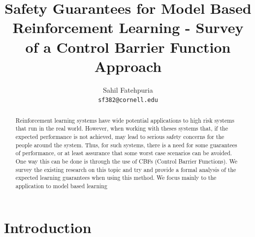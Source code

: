 \documentclass{article}
\title{Safety Guarantees for Model Based Reinforcement Learning - Survey of a Control Barrier Function Approach}
\author{%
  Sahil Fatehpuria \\
  \texttt{sf382@cornell.edu} \\
}
\begin{document}
\maketitle

\begin{abstract}
Reinforcement learning systems have wide potential applications to high risk systems that run in the real world. However, when working with theses systems that, if the expected performance is not achieved, may lead to serious safety concerns for the people around the system. Thus, for such systems, there is a need for some guarantees of performance, or at least assurance that some worst case scenarios can be avoided. One way this can be done is through the use of CBFs (Control Barrier Functions). We survey the existing research on this topic and try and provide a formal analysis of the expected learning guarantees when using this method. We focus mainly to the application to model based learning
\end{abstract}


\section{Introduction}
\end{document}
